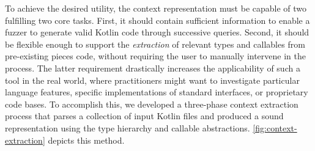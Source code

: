 To achieve the desired utility, the context representation
must be capable of two fulfilling two core tasks.
First, it should contain sufficient information to enable a fuzzer to generate valid Kotlin
code through successive queries.
Second, it should be flexible enough to support the \textit{extraction} of relevant types
and callables from pre-existing pieces code, without requiring the user to manually
intervene in the process.
The latter requirement drastically increases the applicability of such a tool in
the real world, where practitioners might want to investigate particular language features,
specific implementations of standard interfaces, or proprietary 
code bases. To accomplish this, we developed a three-phase context extraction
process that parses a collection of input Kotlin files and produced a
sound representation using the type hierarchy and callable abstractions.
\autoref{fig:context-extraction} depicts this method.

\def\layersep{0.5}
\def\nodesep{0.5}

